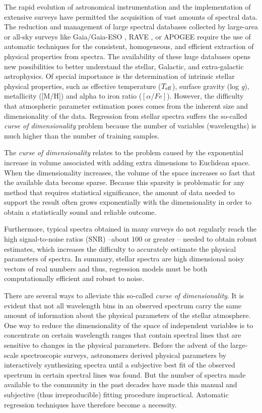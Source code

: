 \documentclass[a4paper,fleqn,usenatbib]{mnras}
\begin{document}
The rapid evolution of astronomical instrumentation and the
implementation of extensive surveys have permitted the acquisition of
vast amounts of spectral data.  The reduction and management of large
spectral databases collected by large-area or all-sky surveys like
Gaia/Gaia-ESO \citep{2006MNRAS.367..290J,2012Msngr.147...25G}, RAVE
\citep{2006AJ....132.1645S}, or APOGEE \citep{2011AJ....142...72E}
require the use of automatic techniques for the consistent,
homogeneous, and efficient extraction of physical properties from
spectra. The availability of these huge databases opens new
possibilities to better understand the stellar, Galactic, and
extra-galactic astrophysics. Of special importance is the
determination of intrinsic stellar physical properties, such as
effective temperature ($T_{\rm eff}$), surface gravity (log
\textit{g}), metallicity ([M/H]) and alpha to iron ratio 
($\left[ \alpha/Fe \right]$). However, the difficulty that
atmospheric parameter estimation poses comes from the inherent size
and dimensionality of the data.  Regression from stellar spectra
suffers the so-called {\sl curse of dimensionality} problem because
the number of variables (wavelengths) is much higher than the number
of training samples. 
    
The \textit{curse of dimensionality} \citep{bellman:61} relates to 
the problem caused by the exponential increase in volume associated 
with adding extra dimensions to Euclidean space. 
When the dimensionality increases, the volume of the space increases so 
fast that the available data become sparse. Because this sparsity is 
problematic for any method that requires statistical significance, the 
amount of data needed to support the result often grows exponentially 
with the dimensionality in order to obtain a statistically sound and 
reliable outcome.

Furthermore, typical spectra obtained in many surveys do not 
regularly reach the high signal-to-noise ratios (SNR) --about
100 or greater -- needed to obtain robust estimates, which
increases the difficulty to accurately estimate the physical
parameters of spectra.  In summary, stellar spectra are high
dimensional noisy vectors of real numbers and thus,
regression models must be both computationally efficient and robust
to noise.

There are several ways to alleviate this so-called \textit{curse of
  dimensionality}. It is evident that not all wavelength bins in an
observed spectrum carry the same amount of information about the
physical parameters of the stellar atmosphere. One way to reduce the
dimensionality of the space of independent variables is to concentrate
on certain wavelength ranges that contain spectral lines that are
sensitive to changes in the physical parameters. Before the
advent of the large-scale spectroscopic surveys, astronomers derived
physical parameters by interactively synthesizing spectra until a
subjective best fit of the observed spectrum in certain spectral lines
was found. But the number of spectra made available to the community
in the past decades have made this manual and subjective (thus
irreproducible) fitting procedure impractical. Automatic regression
techniques have therefore become a necessity.
\end{document}
